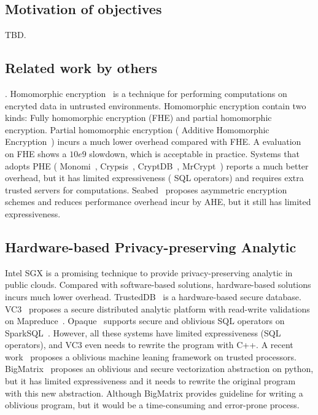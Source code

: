 \vspace{-.15in}\subsection{Motivation of objectives} 
\label{sec:motivation}\vspace{-.075in}
TBD.

\subsection{Related work by others} 
\label{sec:others-work}\vspace{-.075in}

. Homomorphic 
encryption~\cite{fullmomo:stoc09,paillier,elgamal} is a
technique for performing computations on encryted data in untrusted 
environments. Homomorphic encryption contain two kinds: Fully 
homomorphic encryption (FHE) and partial 
homomorphic encryption.
Partial homomorphic encryption (\eg{} Additive Homomorphic 
Encryption~\cite{paillier})
incurs a much lower overhead compared with FHE. A evaluation~\cite{homo:eval} on
FHE shows a $10e9$ slowdown, which is acceptable in practice.
Systems that adopts PHE (\eg{} Monomi~\cite{monomi:vldb13},
Crypsis~\cite{crypsis:hotcloud14}, CryptDB~\cite{cryptdb:sosp11},
MrCrypt~\cite{mrcrypt:oospsla14})
reports a much better overhead, but it has limited expressiveness
(\eg{} SQL operators) and requires extra trusted servers for computations.
Seabed~\cite{seabed:osdi16} proposes asymmetric encryption schemes and reduces 
performance overhead
incur by AHE, but it still has limited expressiveness.

\subsection{Hardware-based Privacy-preserving Analytic}
Intel SGX is a promising technique to provide privacy-preserving analytic
in public clouds. Compared with software-based solutions, hardware-based 
solutions
incurs much lower overhead. TrustedDB~\cite{trusteddb:sigmod11} is a
hardware-based secure database.
VC3~\cite{vc3:sp15} proposes a secure distributed analytic platform
with read-write validations on Mapreduce~\cite{mapreduce}. 
Opaque~\cite{opaque:nsdi17}
supports secure and oblivious SQL operators on 
SparkSQL~\cite{sparksql:sigmod15}.
However, all these systems have limited expressiveness (\eg SQL operators), and
VC3 even needs to rewrite the program with C++. A recent 
work~\cite{oblivious:security16} proposes a oblivious machine leaning
framework on trusted processors.
BigMatrix~\cite{bigmatrix:ccs17} proposes an oblivious and secure vectorization
abstraction on python, but it has limited expressiveness and it needs to
rewrite the original program with this new abstraction.
Although BigMatrix provides guideline for
writing a oblivious program, but it would be a time-consuming and error-prone
process.

